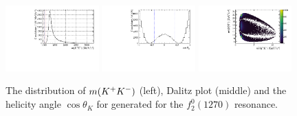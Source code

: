 \begin{figure}[!h]
   \centering   
   \includegraphics[width=0.32\textwidth]{figs/B2DsPhi/f2_phi_mass.pdf}
   \includegraphics[width=0.32\textwidth]{figs/B2DsPhi/f2_Helicity.pdf}
   \includegraphics[width=0.32\textwidth]{figs/B2DsPhi/f2_Dalitz_plot.pdf}
   \caption{The distribution of $m({{K}^+}{{K}^-})$ (left), Dalitz plot (middle) and the helicity angle $\cos\theta_{K}$ for generated for the $f_{2}^{0}(1270)$ resonance.} 
   \label{fig:DsKK_model_f21270}   
\end{figure}


